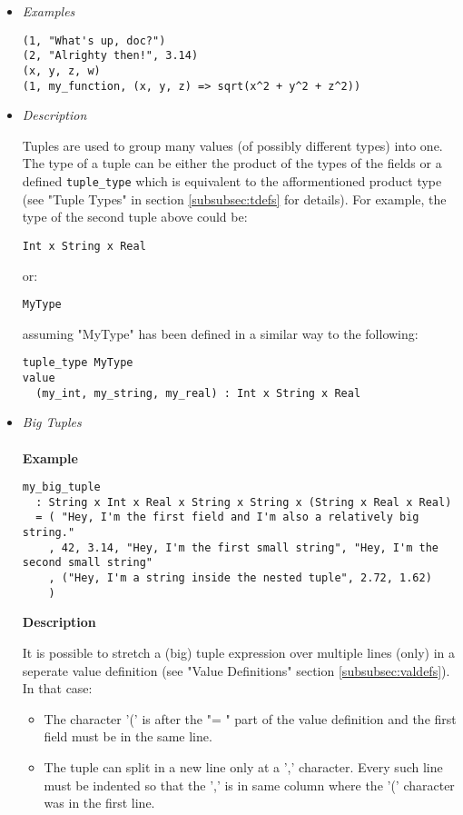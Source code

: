\documentclass{article}
\begin{document}
\begin{itemize}

\item \textit{Examples}
\begin{verbatim}
(1, "What's up, doc?")
(2, "Alrighty then!", 3.14)
(x, y, z, w)
(1, my_function, (x, y, z) => sqrt(x^2 + y^2 + z^2))
\end{verbatim}

\item \textit{Description} 

Tuples are used to group many values (of possibly different types) into one.
The type of a tuple can be either the product of the types of the fields or a
defined \texttt{tuple_type} which is equivalent to the afformentioned product
type (see "Tuple Types" in section \ref{subsubsec:tdefs} for details). For
example, the type of the second tuple above could be:
\begin{verbatim}
Int x String x Real
\end{verbatim}
or:
\begin{verbatim}
MyType
\end{verbatim}
assuming "MyType" has been defined in a similar way to the following:
\begin{verbatim}
tuple_type MyType
value
  (my_int, my_string, my_real) : Int x String x Real
\end{verbatim}

\newpage
\item \textit{Big Tuples}
\\\\
\textbf{Example}
\begin{verbatim}
my_big_tuple
  : String x Int x Real x String x String x (String x Real x Real)
  = ( "Hey, I'm the first field and I'm also a relatively big string."
    , 42, 3.14, "Hey, I'm the first small string", "Hey, I'm the second small string"
    , ("Hey, I'm a string inside the nested tuple", 2.72, 1.62)
    )
\end{verbatim}

\textbf{Description}

It is possible to stretch a (big) tuple expression over multiple lines (only)
in a seperate value definition (see "Value Definitions" section
\ref{subsubsec:valdefs}).  In that case:
\begin{itemize}
\item
The character '(' is after the "= " part of the value definition
and the first field must be in the same line.

\item
The tuple can split in a new line only at a ',' character. Every such line must
be indented so that the ',' is in same column where the '(' character was in
the first line.


\end{itemize}
\end{itemize}
\end{document}
